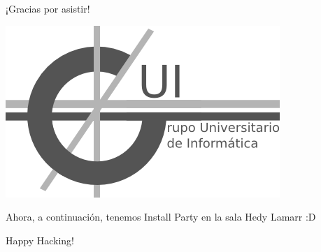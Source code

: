 \documentclass{beamer}
\begin{document}
\begin{frame}
\begin{center}\huge ¡Gracias por asistir!\end{center}
\begin{center}\includegraphics[scale=0.5]{gui.png}\end{center}
\begin{center}Ahora, a continuación, tenemos Install Party en la sala Hedy Lamarr :D\end{center}
\begin{center}\huge Happy Hacking!\end{center}

\end{frame}

\end{document}
